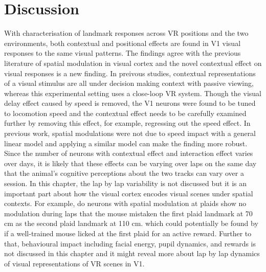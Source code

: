 \section{Discussion}
With characterisation of landmark responses across VR positions and the two environments, both contextual and positional effects are found in V1 visual responses to the same visual patterns. The findings agree with the previous literature of spatial modulation in visual cortex and the novel contextual effect on visual responses is a new finding. In preivous studies, contextual representations of a visual stimulus are all under decision making context with passive viewing, whereas this experimental setting uses a close-loop VR system. Though the visual delay effect caused by speed is removed, the V1 neurons were found to be tuned to locomotion speed and the contextual effect needs to be carefully examined further by removing this effect, for example, regressing out the speed effect. In previous work, spatial modulations were not due to speed impact with a general linear model and applying a similar model can make the finding more robust. Since the number of neurons with contextual effect and interaction effect varies over days, it is likely that these effects can be varying over laps on the same day that the animal's cognitive perceptions about the two tracks can vary over a session. In this chapter, the lap by lap variability is not discussed but it is an important part about how the visual cortex encodes visual scenes under spatial contexts. For example, do neurons with spatial modulation at plaids show no modulation during laps that the mouse mistaken the first plaid landmark at 70 cm as the second plaid landmark at 110 cm. which could potentially be found by if a well-trained mouse licked at the first plaid for an active reward. Further to that, behavioural impact including facial energy, pupil dynamics, and rewards is not discussed in this chapter and it might reveal more about lap by lap dynamics of visual representations of VR scenes in V1.